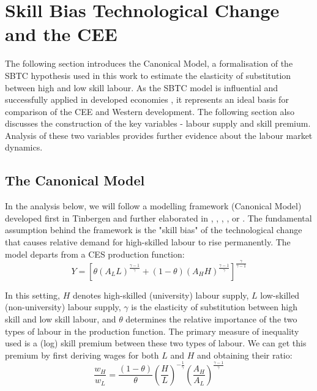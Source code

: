 \documentclass[11pt]{article}
\begin{document}
\newpage
\section{Skill Bias Technological Change and the CEE}
The following section introduces the Canonical Model, a formalisation of the SBTC hypothesis used in this work to estimate the elasticity of substitution between high and low skill labour. As the SBTC model is influential and successfully applied in developed economies \citep{acemoglu2012does, glitz2021skill}, it represents an ideal basis for comparison of the CEE and Western development. The following section also discusses the construction of the key variables - labour supply and skill premium. Analysis of these two variables provides further evidence about the labour market dynamics. 

\subsection{The Canonical Model}
In the analysis below, we will follow a modelling framework (Canonical Model) developed first in Tinbergen and further elaborated in \citet{katz1992changes}, \citet{goldin2010race}, \citet{card2001can}, \citet{acemoglu2011skills}, or \citet{glitz2021skill}.
The fundamental assumption behind the framework is the "skill bias" of the technological change that causes relative demand for high-skilled labour to rise permanently.
The model departs from a CES production function:
\begin{equation}
\label{eqn:STBC_prod_function}
Y = [\theta(A_{L}L)^{\frac{\gamma - 1}{\gamma}} + (1 - \theta)(A_{H}H)^{\frac{\gamma - 1}{\gamma}}]^\frac{\gamma}{\gamma - 1}
\end{equation}

In this setting, $H$ denotes high-skilled (university) labour supply, $L$ low-skilled (non-university) labour supply, $\gamma$ is the elasticity of substitution between high skill and low skill labour, and $\theta$ determines the relative importance of the two types of labour in the production function. The primary measure of inequality used is a (log) skill premium between these two types of labour. We can get this premium by first deriving wages for both $L$ and $H$ and obtaining their ratio:
\[\frac{w_{H}}{w_{L}} = \frac{(1 - \theta)}{\theta} \left(\frac{H}{L}\right)^{-\frac{1}{\gamma}}\left(\frac{A_{H}}{A_{L}}\right)^{\frac{\gamma - 1}{\gamma}}\]
\end{document}

